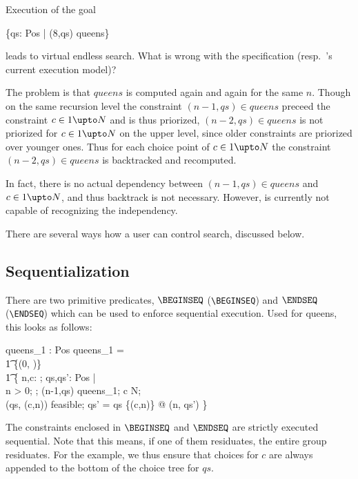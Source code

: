 \documentclass{article}
\begin{document}
Execution of the goal 

\begin{zexecexpr}
  \{qs: \power Pos | (8,qs) \in queens\}
\end{zexecexpr}

leads to virtual endless search. What is wrong with the specification
(resp.~\ZAP{}'s current execution model)?

The problem is that $queens$ is computed again and again for the same
$n$. Though on the same recursion level the constraint $(n-1,qs) \in
queens$ preceed the constraint $c \in 1 \upto N$ and is thus
priorized, $(n-2,qs) \in queens$ is not priorized for $c \in 1 \upto
N$ on the upper level, since older constraints are priorized over younger
ones. Thus for each choice point of $c \in 1 \upto N$ the constraint
$(n-2,qs) \in queens$ is backtracked and recomputed.

In fact, there is no actual dependency between $(n-1,qs) \in queens$
and $c \in 1 \upto N$, and thus backtrack is not necessary.  However,
\ZAP{} is currently not capable of recognizing the independency.

There are several ways how a user can control search, discussed below.

\subsection{Sequentialization}

There are two primitive predicates, $\BEGINSEQ$ (\verb:\BEGINSEQ:)
and $\ENDSEQ$ (\verb:\ENDSEQ:) which can be used to enforce
sequential execution. Used for queens, this looks as follows:

\begin{axdef}
  queens_1 : \nat \rel \power Pos
\where
  queens_1 = \\\t1
    \{(0, \emptyset)\} \cup \\ \t1
    \{\<
      n,c: \nat; qs,qs': \power Pos | \\
      n > 0;
      \BEGINSEQ;
      (n-1,qs) \in queens_1;
      c  \upto N;
      \ENDSEQ \\ 
      (qs, (c,n)) \in feasible; 
      qs' = qs \cup \{(c,n)\}
       @ 
      (n, qs') \} \>
\end{axdef}

The constraints enclosed in $\BEGINSEQ$ and $\ENDSEQ$ are
strictly executed sequential. Note that this means, if one
of them residuates, the entire group residuates. For the
example, we thus ensure that choices for $c$ are always
appended to the bottom of the choice tree for $qs$.
\end{document}

